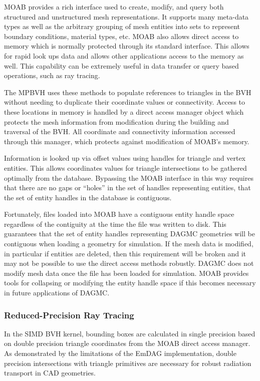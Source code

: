 MOAB provides a rich interface used to create, modify, and query both structured
and unstructured mesh representations. It supports many meta-data types as well as
the arbitrary grouping of mesh entities into sets to represent boundary
conditions, material types, etc. MOAB also allows direct access to memory which
is normally protected through its standard interface. This allows for rapid look
ups data and allows other applications access to the memory as well. This
capability can be extremely useful in data transfer or query based operations,
such as ray tracing.

The MPBVH uses these methods to populate references to triangles in
the BVH without needing to duplicate their coordinate values or
connectivity. Access to these locations in memory is handled by a direct access
manager object which protects the mesh information from modification during the
building and traversal of the BVH. All coordinate and connectivity information
accessed through this manager, which protects against modification of MOAB's
memory.

Information is looked up via offset values using handles for triangle and vertex
entities. This allows coordinates values for triangle intersections to be
gathered optimally from the database. Bypassing the MOAB interface in this way
requires that there are no gaps or ``holes'' in the set of handles representing
entities, that the set of entity handles in the database is contiguous.

Fortunately, files loaded into MOAB have a contiguous entity handle space
regardless of the contiguity at the time the file was written to disk. This
guarantees that the set of entity handles representing DAGMC geometries will be
contiguous when loading a geometry for simulation. If the mesh data is modified,
in particular if entities are deleted, then this requirement will be broken and
it may not be possible to use the direct access methods robustly. DAGMC does not
modify mesh data once the file has been loaded for simulation. MOAB provides
tools for collapsing or modifying the entity handle space if this becomes
necessary in future applications of DAGMC.

\subsubsection{Reduced-Precision Ray Tracing}\label{subsubsec:reduced_precision}

In the SIMD BVH kernel, bounding boxes are calculated in single precision based
on double precision triangle coordinates from the MOAB direct access manager. As
demonstrated by the limitations of the EmDAG implementation, double precision
intersections with triangle primitives are necessary for robust radiation
transport in CAD geometries.

